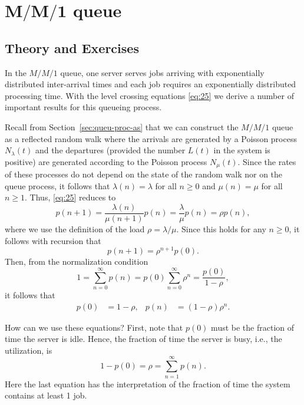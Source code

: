 \section
[$M/M/1$ queue]
{$\mathbf{M/M/1}$ queue}
\label{sec:mm1}


\subsection*{Theory and Exercises}


In the $M/M/1$ queue, one server serves jobs arriving with exponentially distributed inter-arrival times and each job requires an exponentially distributed processing time.
With the level crossing equations \eqref{eq:25} we  derive a number of important results for this queueing process.

Recall from Section~\ref{sec:queu-proc-as} that we can construct the
$M/M/1$ queue as a reflected random walk where the arrivals are
generated by a Poisson process $N_\lambda(t)$ and the departures
(provided the number $L(t)$ in the system is positive) are generated according to the
Poisson process $N_\mu(t)$. Since the rates of these processes do not
depend on the state of the random walk nor on  the queue process, it follows that
$\lambda(n)=\lambda$ for all $n \geq 0$ and $\mu(n)=\mu$ for all $n \geq 1$. Thus, \eqref{eq:25}
reduces to
\begin{equation*}
  p(n+1) = \frac{\lambda(n)}{\mu(n+1)} p(n) = \frac{\lambda}{\mu} p(n) = \rho p(n),
\end{equation*}
where we use the definition of the load $\rho=\lambda/\mu$. Since this
holds for any $n\geq 0$, it follows with recursion that
\begin{equation*}
  p(n+1) = \rho^{n+1} p(0).
\end{equation*}
Then, from the normalization condition
\begin{equation*}
1=  \sum_{n=0}^\infty p(n) = p(0)\sum_{n=0}^\infty \rho^n = \frac{p(0)}{1-\rho},
\end{equation*}
it follows that
\begin{align}\label{eq:23}
p(0) &=1-\rho, &   p(n) &=  (1-\rho)\rho^{n}.
\end{align}

How can we use these equations? First, note that $p(0)$ must be the
fraction of time the server is idle. Hence, the fraction of time the
server is busy, i.e., the utilization, is
\begin{equation*}
  1-p(0) = \rho = \sum_{n=1}^\infty p(n).
\end{equation*}
Here the last equation has the interpretation of the fraction of time
the system contains at least 1 job. 


